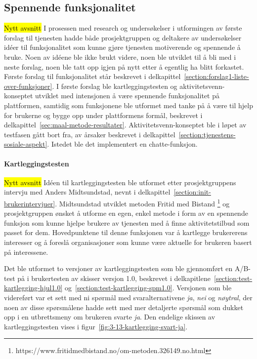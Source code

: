 \subsection{Spennende funksjonalitet}
\hl{Nytt avsnitt}
I prosessen med research og undersøkelser i utformingen av første forslag til tjenesten hadde både prosjektgruppen og deltakere av undersøkelser idéer til funksjonalitet som kunne gjøre tjenesten motiverende og spennende å bruke. Noen av idéene ble ikke brukt videre, noen ble utviklet til å bli med i neste forslag, noen ble tatt opp igjen på nytt etter å egentlig ha blitt forkastet. Første forslag til funksjonalitet står beskrevet i delkapittel~\ref{section:forslag1-liste-over-funksjoner}. I første forslag ble kartleggingstesten og aktivitetsvenn-konseptet utviklet med intensjonen å være spennende funksjonalitet på plattformen, samtidig som funksjonene ble utformet med tanke på å være til hjelp for brukerne og bygge opp under plattformens formål, beskrevet i delkapittel~\ref{sec:maal-metode-resultater}. Aktivitetsvenn-konseptet ble i løpet av testfasen gått bort fra, av årsaker beskrevet i delkapittel~\ref{section:tjenestens-sosiale-aspekt}. Istedet ble det implementert en chatte-funksjon.

\paragraph{Kartleggingstesten}
\hl{Nytt avsnitt}
Idéen til kartleggingstesten ble utformet etter prosjektgruppens intervju med Anders Midtsundstad, nevnt i delkapittel~\ref{section:init-brukerintervjuer}. Midtsundstad utviklet metoden Fritid med Bistand \footnote{https://www.fritidmedbistand.no/om-metoden.326149.no.html} og prosjektgruppen ønsket å utforme en egen, enkel metode i form av en spennende funksjon som kunne hjelpe brukere av tjenesten med å finne aktivitetstilbud som passet for dem. Hovedpunktene til denne funksjonen var å kartlegge brukererens interesser og å foreslå organisasjoner som kunne være aktuelle for brukeren basert på interessene. 

Det ble utformet to versjoner av kartleggingstesten som ble gjennomført en A/B-test på i brukertesten av skisser versjon 1.0, beskrevet i delkapitlene~\ref{section:test-kartlegging-hjul1.0} og~\ref{section:test-kartlegging-spm1.0}. Versjonen som ble videreført var et sett med ni spørmål med svaralternativene {\em ja}, {\em nei} og {\em nøytral}, der noen av disse spørsmålene hadde sett med mer detaljerte spørsmål som dukket opp i en utbrettsmeny om brukeren svarte {\em ja}. Den endelige skissen av kartleggingstesten vises i figur~\ref{fig:3-13-kartlegging-svart-ja}. 

